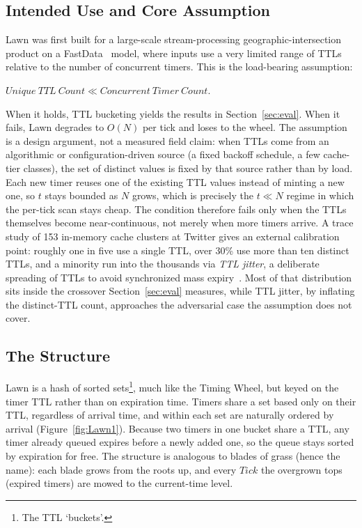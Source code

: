 \documentclass[conference]{IEEEtran}
\begin{document}
\subsection{Intended Use and Core Assumption}
Lawn was first built for a large-scale stream-processing geographic-intersection product on a FastData~\cite{GP} model, where inputs use a very limited range of TTLs relative to the number of concurrent timers. This is the load-bearing assumption:
\begin{center}
	$ Unique\ TTL\ Count \ll Concurrent\ Timer\ Count. $
\end{center}
When it holds, TTL bucketing yields the results in Section~\ref{sec:eval}. When it fails, Lawn degrades to $O(N)$ per tick and loses to the wheel. The assumption is a design argument, not a measured field claim: when TTLs come from an algorithmic or configuration-driven source (a fixed backoff schedule, a few cache-tier classes), the set of distinct values is fixed by that source rather than by load. Each new timer reuses one of the existing TTL values instead of minting a new one, so $t$ stays bounded as $N$ grows, which is precisely the $t \ll N$ regime in which the per-tick scan stays cheap. The condition therefore fails only when the TTLs themselves become near-continuous, not merely when more timers arrive. A trace study of 153 in-memory cache clusters at Twitter gives an external calibration point: roughly one in five use a single TTL, over 30\% use more than ten distinct TTLs, and a minority run into the thousands via \textit{TTL jitter}, a deliberate spreading of TTLs to avoid synchronized mass expiry~\cite{TwitterTraces}. Most of that distribution sits inside the crossover Section~\ref{sec:eval} measures, while TTL jitter, by inflating the distinct-TTL count, approaches the adversarial case the assumption does not cover.

\subsection{The Structure}
Lawn is a hash of sorted sets\footnote{The TTL `buckets'.}, much like the Timing Wheel, but keyed on the timer TTL rather than on expiration time. Timers share a set based only on their TTL, regardless of arrival time, and within each set are naturally ordered by arrival (Figure~\ref{fig:Lawn1}). Because two timers in one bucket share a TTL, any timer already queued expires before a newly added one, so the queue stays sorted by expiration for free. The structure is analogous to blades of grass (hence the name): each blade grows from the roots up, and every $Tick$ the overgrown tops (expired timers) are mowed to the current-time level.
\end{document}
